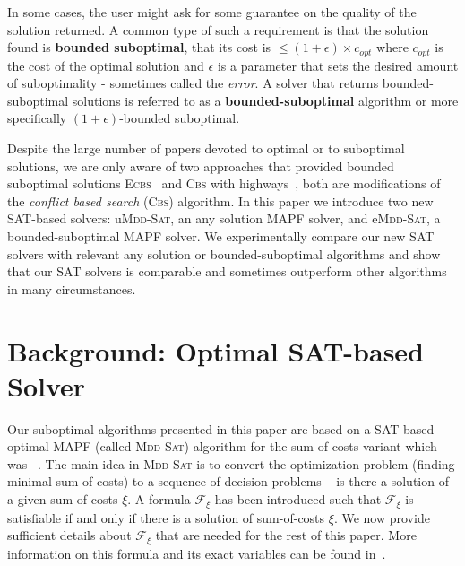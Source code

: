 \documentclass[letterpaper]{article}
\begin{document}

In some cases, the user might ask for some guarantee on the
quality of the solution returned. A common type of such a requirement
is that the solution found is {\bf
bounded suboptimal}, that its cost is $\leq (1+\epsilon)
\times c_{opt}$ where $c_{opt}$ is the cost of the optimal solution and $\epsilon$ is a parameter that sets the desired amount of suboptimality - sometimes called the {\em error}. A solver that returns bounded-suboptimal solutions is referred to as a {\bf
bounded-suboptimal} algorithm or more specifically $(1+\epsilon)$-bounded suboptimal.



Despite the large number of papers devoted to optimal or to suboptimal
solutions, we are only aware of two approaches that provided bounded suboptimal
solutions \textsc{Ecbs}~\cite{barer2014suboptimal} and \textsc{Cbs} with
highways~\cite{CohenUK15}, both are modifications of the {\em conflict based
search} (\textsc{Cbs}) algorithm. In this paper we introduce two new SAT-based
solvers: u\textsc{Mdd-Sat}, an any solution MAPF solver, and e\textsc{Mdd-Sat}, a bounded-suboptimal MAPF solver. 
We experimentally compare our new SAT solvers with
relevant any solution or bounded-suboptimal algorithms and show that our SAT
solvers is comparable and sometimes outperform other algorithms in many circumstances.

\section{Background: Optimal SAT-based Solver}

Our suboptimal algorithms presented in this paper are based on a SAT-based
optimal MAPF (called \textsc{Mdd-Sat}) algorithm for the sum-of-costs variant which was
~\cite{SurynekFSB16}. The main idea in \textsc{Mdd-Sat} is to convert the optimization
problem (finding minimal sum-of-costs) to a sequence of decision problems -- is
there a solution of a given sum-of-costs $\xi$. A formula $\mathcal{F}_\xi$ has
been introduced such that $\mathcal{F}_\xi$ is satisfiable if and only if there
is a solution of sum-of-costs $\xi$. We now provide sufficient details about
$\mathcal{F}_\xi$ that are needed for the rest of this paper. More information
on this formula and its exact variables can be found in~\cite{SurynekFSB16}.
\end{document}
